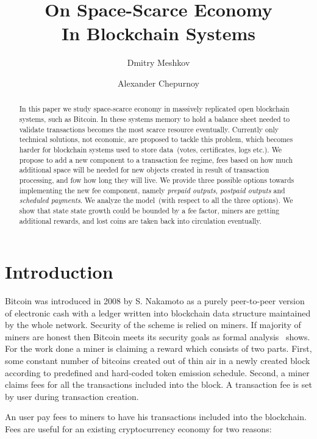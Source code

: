 \documentclass[]{llncs}   %
\begin{document}
\title{On Space-Scarce Economy\\ In Blockchain Systems}
\author{Dmitry Meshkov \and Alexander Chepurnoy}
\maketitle

\begin{abstract}
In this paper we study space-scarce economy in massively replicated open blockchain systems, such as Bitcoin. In these systems memory to hold a balance sheet needed to validate transactions becomes the most scarce resource eventually. Currently only technical solutions, not economic, are proposed to tackle this problem, which becomes harder for blockchain systems used to store data~(votes, certificates, logs etc.). We propose to add a new component to a transaction fee regime, fees based on how much additional space will be needed for new objects created in result of transaction processing, and fow how long they will live. We provide three possible options towards implementing the new fee component, namely \textit{prepaid outputs}, \textit{postpaid outputs} and \textit{scheduled payments}. We analyze the model~(with respect to all the three options). We show that state state growth could be bounded by a fee factor, miners are getting additional rewards, and lost coins are taken back into circulation eventually.    
\end{abstract}

\section{Introduction}

Bitcoin \cite{Nakamoto2008} was introduced in 2008 by S. Nakamoto as a purely peer-to-peer version of electronic cash with a ledger written into blockchain data structure maintained by the whole network. Security of the scheme is relied on miners. If majority of miners are honest then Bitcoin meets its security goals as formal analysis~\cite{Garay2015} shows. For the work done a miner is claiming a reward which consists of two parts. First, some constant number of bitcoins created out of thin air in a newly created block according to predefined and hard-coded token emission schedule. Second, a miner claims fees for all the transactions included into the block. A transaction fee is set by user during transaction creation.


An user pay fees to miners to have his transactions included into the blockchain. Fees are useful for an existing cryptocurrency economy for two reasons:
\end{document}
